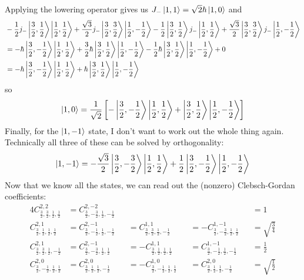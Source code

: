 \documentclass[a4paper,twoside]{article}
\begin{document}
\begin{problem}
    Applying the lowering operator gives us $ J_-\ket{1, 1} = \sqrt{2} \hbar\ket{1,0} $ and
    \begin{align}
        &- \frac{1}{2} j_-\ket{\frac{3}{2}, \frac{1}{2}}\ket{\frac{1}{2}, \frac{1}{2}} + \frac{\sqrt{3}}{2} j_-\ket{\frac{3}{2}, \frac{3}{2}}\ket{\frac{1}{2}, - \frac{1}{2}} - \frac{1}{2} \ket{\frac{3}{2}, \frac{1}{2}}j_-\ket{\frac{1}{2}, \frac{1}{2}} + \frac{\sqrt{3}}{2} \ket{\frac{3}{2}, \frac{3}{2}}j_-\ket{\frac{1}{2}, - \frac{1}{2}} \\
        &= - \hbar \ket{\frac{3}{2}, -\frac{1}{2}}\ket{\frac{1}{2}, \frac{1}{2}} + \frac{3}{2} \hbar\ket{\frac{3}{2}, \frac{1}{2}}\ket{\frac{1}{2}, - \frac{1}{2}} - \frac{1}{2} \hbar \ket{\frac{3}{2}, \frac{1}{2}}\ket{\frac{1}{2}, -\frac{1}{2}} + 0 \\
        &= - \hbar\ket{\frac{3}{2}, - \frac{1}{2}}\ket{\frac{1}{2}, \frac{1}{2}} + \hbar\ket{\frac{3}{2}, \frac{1}{2}}\ket{\frac{1}{2}, - \frac{1}{2}}
    \end{align}
    so
    \begin{equation}
        \ket{1,0} = \frac{1}{\sqrt{2}} \left[-\ket{\frac{3}{2}, -\frac{1}{2}}\ket{\frac{1}{2}, \frac{1}{2}} +\ket{\frac{3}{2}, \frac{1}{2}}\ket{\frac{1}{2}, - \frac{1}{2}}\right]
    \end{equation}
    Finally, for the $\ket{1,-1} $ state, I don't want to work out the whole thing again. Technically all three of these can be solved by orthogonality:
    \begin{equation}
        \ket{1,-1} = - \frac{\sqrt{3}}{2}\ket{\frac{3}{2}, - \frac{3}{2}}\ket{\frac{1}{2}, \frac{1}{2}} + \frac{1}{2}\ket{\frac{3}{2}, - \frac{1}{2}}\ket{\frac{1}{2}, - \frac{1}{2}}
    \end{equation}
    Now that we know all the states, we can read out the (nonzero) Clebsch-Gordan coefficients:
    \begin{alignat}{4}
        C^{2,2}_{\frac{3}{2}, \frac{3}{2}, \frac{1}{2}, \frac{1}{2}} &= C^{2,-2}_{\frac{3}{2}, -\frac{3}{2}, \frac{1}{2}, -\frac{1}{2}} && && &&= 1 \\
        C^{2,1}_{\frac{3}{2}, \frac{1}{2}, \frac{1}{2}, \frac{1}{2}} &= C^{2,-1}_{\frac{3}{2}, -\frac{1}{2}, \frac{1}{2}, -\frac{1}{2}} &&= C^{1,1}_{\frac{3}{2}, \frac{3}{2}, \frac{1}{2}, -\frac{1}{2}} &&= - C^{1,-1}_{\frac{3}{2}, -\frac{3}{2}, \frac{1}{2}, \frac{1}{2}} &&= \sqrt{\frac{3}{4}} \\
        C^{2,1}_{\frac{3}{2}, \frac{3}{2}, \frac{1}{2}, -\frac{1}{2}} &= C^{2,-1}_{\frac{3}{2}, -\frac{3}{2}, \frac{1}{2}, \frac{1}{2}} &&= - C^{1,1}_{\frac{3}{2}, \frac{1}{2}, \frac{1}{2}, \frac{1}{2}} &&= C^{1,-1}_{\frac{3}{2}, -\frac{1}{2}, \frac{1}{2}, -\frac{1}{2}} &&= \frac{1}{2} \\
        C^{2,0}_{\frac{3}{2}, -\frac{1}{2}, \frac{1}{2}, \frac{1}{2}} &= C^{2,0}_{\frac{3}{2}, \frac{1}{2}, \frac{1}{2}, -\frac{1}{2}} &&= -C^{1,0}_{\frac{3}{2}, -\frac{1}{2}, \frac{1}{2}, \frac{1}{2}} &&= C^{2,0}_{\frac{3}{2}, \frac{1}{2}, \frac{1}{2}, -\frac{1}{2}} &&= \sqrt{\frac{1}{2}} \\
    \end{alignat}
\end{problem}
\end{document}
